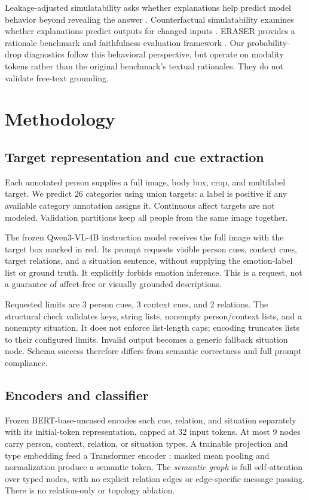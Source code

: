 \documentclass[conference]{IEEEtran}
\newcommand{\ev}[2]{#2}
\begin{document}
Leakage-adjusted simulatability asks whether explanations help predict model behavior beyond revealing the answer \cite{simulatability}. Counterfactual simulatability examines whether explanations predict outputs for changed inputs \cite{counterfactual}. ERASER provides a rationale benchmark and faithfulness evaluation framework \cite{eraser}. Our probability-drop diagnostics follow this behavioral perspective, but operate on modality tokens rather than the original benchmark's textual rationales. They do not validate free-text grounding.

\section{Methodology}\label{sec:method}
\subsection{Target representation and cue extraction}
Each annotated person supplies a full image, body box, crop, and multilabel target. We predict \ev{labels}{26} categories using union targets: a label is positive if any available category annotation assigns it. Continuous affect targets are not modeled. Validation partitions keep all people from the same image together.

The frozen \ev{qwen}{Qwen3-VL-4B} instruction model receives the full image with the target box marked in red. Its prompt requests visible person cues, context cues, target relations, and a situation sentence, without supplying the emotion-label list or ground truth. It explicitly forbids emotion inference. This is a request, not a guarantee of affect-free or visually grounded descriptions.

Requested limits are \ev{max-person-cues}{3} person cues, \ev{max-context-cues}{3} context cues, and \ev{max-relations}{2} relations. The structural check validates keys, string lists, nonempty person/context lists, and a nonempty situation. It does not enforce list-length caps; encoding truncates lists to their configured limits. Invalid output becomes a generic fallback situation node. Schema success therefore differs from semantic correctness and full prompt compliance.

\subsection{Encoders and classifier}
Frozen BERT-base-uncased \cite{bert} encodes each cue, relation, and situation separately with its initial-token representation, capped at \ev{bert-max-length}{32} input tokens. At most \ev{max-graph-nodes}{9} nodes carry person, context, relation, or situation types. A trainable projection and type embedding feed a Transformer encoder \cite{transformer}; masked mean pooling and normalization produce a semantic token. The \emph{semantic graph} is full self-attention over typed nodes, with no explicit relation edges or edge-specific message passing. There is no relation-only or topology ablation.
\end{document}
